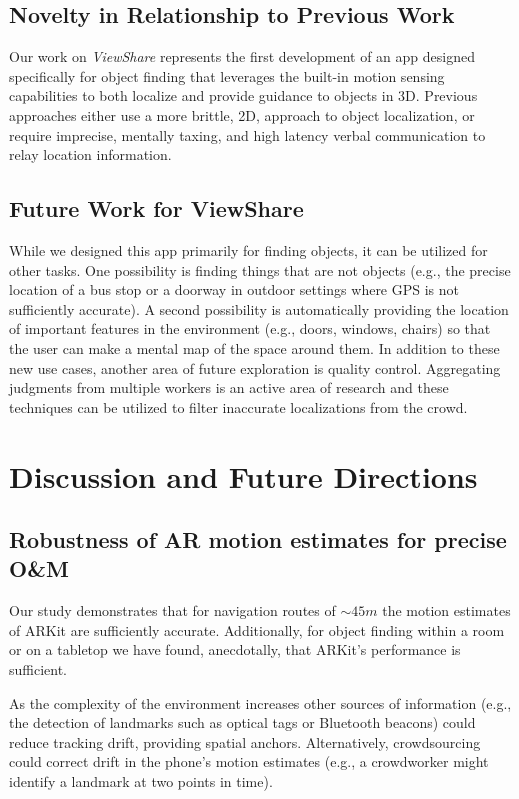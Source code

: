 \documentclass[chi_draft]{sigchi}
\newcommand{\OM}{O\&M\xspace}
\begin{document}
\subsection{Novelty in Relationship to Previous Work}
Our work on \emph{ViewShare} represents the first development of an app designed specifically for object finding that leverages the built-in motion sensing capabilities to both localize and provide guidance to objects in 3D.  Previous approaches either use a more brittle, 2D, approach to object localization, or require imprecise, mentally taxing, and high latency verbal communication to relay location information.

\subsection{Future Work for ViewShare}
While we designed this app primarily for finding objects, it can be utilized for other tasks.  One possibility is finding things that are not objects (e.g., the precise location of a bus stop or a doorway in outdoor settings where GPS is not sufficiently accurate).  A second possibility is automatically providing the location of important features in the environment (e.g., doors, windows, chairs) so that the user can make a mental map of the space around them.  In addition to these new use cases, another area of future exploration is quality control.  Aggregating judgments from multiple workers is an active area of research and these techniques can be utilized to filter inaccurate localizations from the crowd.

\section{Discussion and Future Directions}

\subsection{Robustness of AR motion estimates for precise \OM} Our study demonstrates that for navigation routes of $\sim45m$ the motion estimates of ARKit are sufficiently accurate.  Additionally, for object finding within a room or on a tabletop we have found, anecdotally, that ARKit's performance is sufficient.

As the complexity of the environment increases other sources of information (e.g., the detection of landmarks such as optical tags or Bluetooth beacons) could reduce tracking drift, providing spatial anchors.  Alternatively, crowdsourcing could correct drift in the phone's motion estimates (e.g., a crowdworker might identify a landmark at two points in time).
\end{document}

